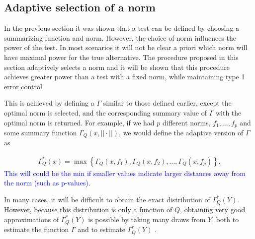 \documentclass{article}
\newcommand{\norm}{f}
\newcommand{\rvv}{Y}
\newcommand{\distv}{Q}
\begin{document}
\subsection{Adaptive selection of a norm}
In the previous section it was shown that a test can be defined by choosing a summarizing function and norm. However, the choice of norm influences the power of the test. In most scenarios it will not be clear a priori which norm will have maximal power for the true alternative. The procedure proposed in this section adaptively selects a norm and it will be shown that this procedure achieves greater power than a test with a fixed norm, while maintaining type 1 error control.  

This is achieved by defining a $\Gamma$ similar to those defined earlier, except the optimal norm is selected, and the corresponding summary value of $\Gamma$ with the optimal norm is returned.  For example, if we had $p$ different norms, $\norm_1, \dots, \norm_p$ and some summary function $\Gamma_\distv(x, ||\cdot||)$, we would define the adaptive version of $\Gamma$ as

\begin{align*}
	\Gamma^*_\distv(x) = \max\left\{\Gamma_\distv(x, \norm_1), \Gamma_\distv(x, \norm_2), \dots, \Gamma_\distv(x, \norm_p)\right\}.
\end{align*}
\textcolor{blue}{This will could be the min if smaller values indicate larger distances away from the norm (such as p-values).}  

In many cases, it will be difficult to obtain the exact distribution of $\Gamma_\distv^*(\rvv)$. However, because this distribution is only a function of $\distv$, obtaining very good approximations of $\Gamma_\distv^*(\rvv)$ is possible by taking many draws from $\rvv$, both to estimate the function $\Gamma$ and to estimate $\Gamma^*_\distv(\rvv)$ .


\end{document}
